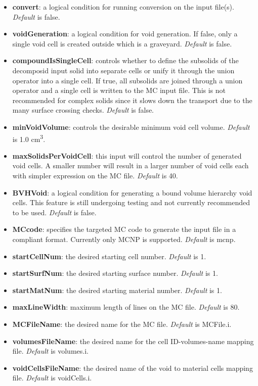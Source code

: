 \documentclass[letterpaper, 12 pt]{report}
\begin{document}
	\begin{itemize}
	  \item \textbf{convert}: a logical condition for running conversion on the input file(s). \emph{Default} is false.
	  \item \textbf{voidGeneration}: a logical condition for void generation. If false, only a single void cell is created outside which is a graveyard. \emph{Default} is false.
	  \item \textbf{compoundIsSingleCell}: controls whether to define the subsolids of the decomposid input solid into separate cells or unify it through the union operator into a single cell. If true, all subsolids are joined  through a union operator and a single cell is written to the MC input file. This is not recommended for complex solids since it slows down the transport due to the many surface crossing checks. \emph{Default} is false.
	  \item \textbf{minVoidVolume}: controls the desirable minimum void cell volume. \emph{Default} is 1.0 cm\textsuperscript{3}.
	  \item \textbf{maxSolidsPerVoidCell}: this input will control the number of generated void cells. A smaller number will result in a larger number of void cells each with simpler expression on the MC file. \emph{Default} is 40.
	  \item \textbf{BVHVoid}: a logical condition for generating a bound volume hierarchy void cells. This feature is still undergoing testing and not currently recommended to be used. \emph{Default} is false.
	  \item \textbf{MCcode}: specifies the targeted MC code to generate the input file in a compliant format. Currently only MCNP is supported. \emph{Default} is mcnp.
	  \item \textbf{startCellNum}: the desired starting cell number. \emph{Default} is 1.
	  \item \textbf{startSurfNum}: the desired starting surface number. \emph{Default} is 1.
	  \item \textbf{startMatNum}: the desired starting material number. \emph{Default} is 1.
	  \item \textbf{maxLineWidth}: maximum length of lines on the MC file. \emph{Default} is 80.
	  \item \textbf{MCFileName}: the desired name for the MC file. \emph{Default} is MCFile.i.
	  \item \textbf{volumesFileName}: the desired name for the cell ID-volumes-name mapping file. \emph{Default} is volumes.i.
	  \item \textbf{voidCellsFileName}: the desired name of the void to material cells mapping file. \emph{Default} is voidCells.i.
    \end{itemize}
\end{document}
